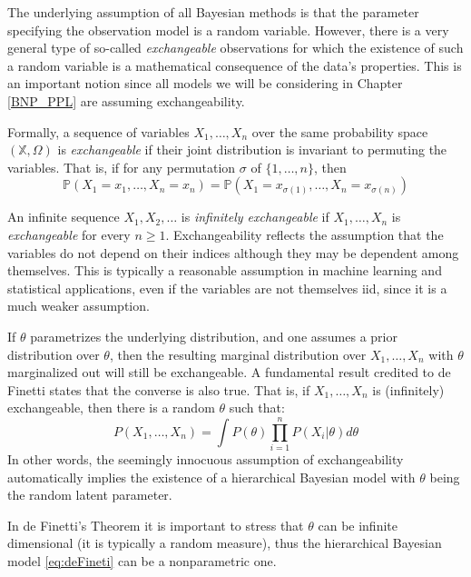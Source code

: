 The underlying assumption of all Bayesian methods is that the parameter specifying the observation model is a random variable. 
However, there is a very general type of so-called \textit{exchangeable} observations for which the existence of such a random variable is a mathematical consequence of the data's properties. This is an important notion since all models we will be considering in Chapter \ref{BNP_PPL} are assuming exchangeability.

Formally, a sequence of variables $X_1,\dots,X_n$ over the same probability space $(\mathbb{X},\Omega)$ is \textit{exchangeable} if their joint distribution is invariant to permuting the variables. That is, if for any permutation $\sigma$ of $\{1,\dots,n\}$, then
$$ \mathbb{P}(X_1=x_1,\dots,X_n=x_n) = \mathbb{P}(X_1=x_{\sigma(1)},\dots,X_n=x_{\sigma(n)}) $$

An infinite sequence $X_1,X_2,\dots$ is \textit{infinitely exchangeable} if $X_1,\dots,X_n$ is \textit{exchangeable} for every $n \ge 1$. Exchangeability reflects the assumption that the variables do not depend on their indices although they may be dependent among themselves. This is typically a reasonable assumption in machine learning and statistical applications, even if the variables are not themselves iid, since it is a much weaker assumption.

If $\theta$ parametrizes the underlying distribution, and one assumes a prior distribution over $\theta$, then the resulting marginal distribution over $X_1,\dots,X_n$ with $\theta$ marginalized out will still be exchangeable. A fundamental result credited to de Finetti \cite{finetti31} states that the converse is also true. That is, if $X_1,\dots,X_n$ is (infinitely) exchangeable, then there is a random $\theta$ such that:
\begin{equation} \label{eq:deFineti}
P(X_1,\dots,X_n) = \int{P(\theta)\prod_{i=1}^n{P(X_i|\theta) d\theta}}
\end{equation}
In other words, the seemingly innocuous assumption of exchangeability automatically implies the existence of a hierarchical Bayesian model with $\theta$ being the random latent parameter.

In de Finetti's Theorem it is important to stress that $\theta$ can be infinite dimensional (it is typically a random measure), thus the hierarchical Bayesian model \ref{eq:deFineti} can be a nonparametric one.%

